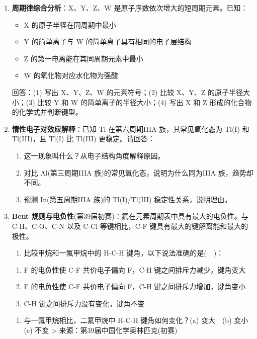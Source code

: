 \documentclass[a4paper,11pt]{ctexart}
\providecommand{\tightlist}{\setlength{\itemsep}{0pt}\setlength{\parskip}{0pt}}
\newcommand{\箭}{\ensuremath{\rightarrow}}
\newcommand{\左箭}{\ensuremath{\leftarrow}}
\newcommand{\上箭}{\ensuremath{\uparrow}}
\newcommand{\下箭}{\ensuremath{\downarrow}}
\newcommand{\衡}{\ensuremath{\rightleftharpoons}}
\newcommand{\双箭}{\ensuremath{\leftrightarrow}}
\newcommand{\约等于}{\ensuremath{\approx}}
\newcommand{\小于等于}{\ensuremath{\leq}}
\newcommand{\大于等于}{\ensuremath{\geq}}
\newcommand{\不等于}{\ensuremath{\neq}}
\newcommand{\西格马}{\ensuremath{\sigma}}
\newcommand{\派}{\ensuremath{\pi}}
\begin{document}
\begin{enumerate}
  请推断 A、B、C、D 的元素符号，并说明推理过程。
\item
  \textbf{周期律综合分析}：X、Y、Z、W 是原子序数依次增大的短周期元素。已知：

  \begin{itemize}
  \tightlist
  \item
    X 的原子半径在同周期中最小
  \item
    Y 的简单离子与 W 的简单离子具有相同的电子层结构
  \item
    Z 的第一电离能在其同周期元素中最小
  \item
    W 的氧化物对应水化物为强酸
  \end{itemize}

  回答：(1) 写出 X、Y、Z、W 的元素符号；(2) 比较 X、Y、Z 的原子半径大小；(3) 比较 Y 和 W 的简单离子的半径大小；(4) 写出 X 和 Z 形成的化合物的化学式并判断键型。
\item
  \textbf{惰性电子对效应解释}：已知 Tl 在第六周期IIIA 族，其常见氧化态为 Tl(I) 和 Tl(III)，且 Tl(I) 比 Tl(III) 更稳定。请回答：

  \begin{enumerate}
  \def\labelenumii{(\arabic{enumii})}
  \tightlist
  \item
    这一现象叫什么？从电子结构角度解释原因。
  \item
    对比 Al(第三周期IIIA 族)的常见氧化态，说明为什么同为IIIA 族，趋势却不同。
  \item
    预测 In(第五周期IIIA 族)的 Tl(I)/Tl(III) 稳定性关系，说明理由。
  \end{enumerate}
\item
  \textbf{Bent 规则与电负性}(第39届初赛)：氟在元素周期表中具有最大的电负性。与 C-H、C-O、C-N 以及 C-Cl 等键相比，C-F 键具有最大的键解离能和最大的极性。

  \begin{enumerate}
  \def\labelenumii{(\arabic{enumii})}
  \tightlist
  \item
    比较甲烷和一氟甲烷中的 H-C-H 键角，以下说法准确的是(　)：
  \end{enumerate}

  \begin{enumerate}
  \def\labelenumii{(\alph{enumii})}
  \tightlist
  \item
    F 的电负性使 C-F 共价电子偏向 F，C-H 键之间排斥力减少，键角变大
  \item
    F 的电负性使 C-F 共价电子偏向 F，C-H 键之间排斥力增加，键角变小
  \item
    C-H 键之间排斥力没有变化，键角不变
  \end{enumerate}

  \begin{enumerate}
  \def\labelenumii{(\arabic{enumii})}
  \setcounter{enumii}{1}
  \tightlist
  \item
    与一氟甲烷相比，二氟甲烷中 H-C-H 键角如何变化？(a) 变大　(b) 变小　(c) 不变
    \textgreater{} 来源：第39届中国化学奥林匹克(初赛)
  \end{enumerate}
\end{enumerate}
\end{document}
